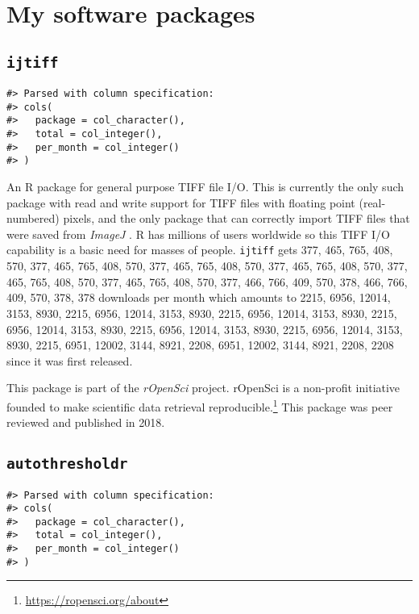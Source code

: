 \documentclass[12pt,]{book}
\let\rmarkdownfootnote\footnote%
\def\footnote{\protect\rmarkdownfootnote}
\theoremstyle{definition}
\theoremstyle{definition}
\theoremstyle{definition}
\theoremstyle{remark}
\begin{document}
\section{My software packages}\label{my-software-packages}

\subsection{\texorpdfstring{\texttt{ijtiff}}{ijtiff}}\label{ijtiff}

\begin{verbatim}
#> Parsed with column specification:
#> cols(
#>   package = col_character(),
#>   total = col_integer(),
#>   per_month = col_integer()
#> )
\end{verbatim}

An R package for general purpose TIFF file I/O. This is currently the
only such package with read and write support for TIFF files with
floating point (real-numbered) pixels, and the only package that can
correctly import TIFF files that were saved from \emph{ImageJ}
\citep{ImageJ}. R has millions of users worldwide so this TIFF I/O
capability is a basic need for masses of people. \texttt{ijtiff} gets
377, 465, 765, 408, 570, 377, 465, 765, 408, 570, 377, 465, 765, 408,
570, 377, 465, 765, 408, 570, 377, 465, 765, 408, 570, 377, 465, 765,
408, 570, 377, 466, 766, 409, 570, 378, 466, 766, 409, 570, 378, 378
downloads per month which amounts to 2215, 6956, 12014, 3153, 8930,
2215, 6956, 12014, 3153, 8930, 2215, 6956, 12014, 3153, 8930, 2215,
6956, 12014, 3153, 8930, 2215, 6956, 12014, 3153, 8930, 2215, 6956,
12014, 3153, 8930, 2215, 6951, 12002, 3144, 8921, 2208, 6951, 12002,
3144, 8921, 2208, 2208 since it was first released.

This package is part of the \emph{rOpenSci} project. rOpenSci is a
non-profit initiative founded to make scientific data retrieval
reproducible.\footnote{\url{https://ropensci.org/about}} This package
was peer reviewed and published in 2018.\citep{ijtiff}

\subsection{\texorpdfstring{\texttt{autothresholdr}}{autothresholdr}}\label{autothresholdr}

\begin{verbatim}
#> Parsed with column specification:
#> cols(
#>   package = col_character(),
#>   total = col_integer(),
#>   per_month = col_integer()
#> )
\end{verbatim}
\end{document}
